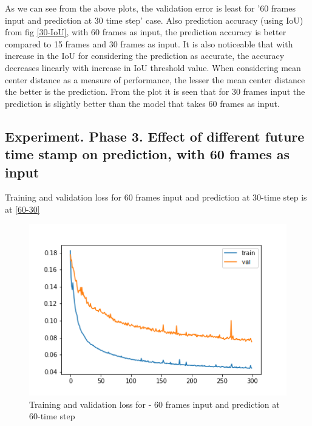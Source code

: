 



As we can see from the above plots, the validation error is least for '60 frames input and prediction at 30 time step' case. Also prediction accuracy (using IoU) from fig \ref{30-IoU}, with 60 frames as input, the prediction accuracy is better compared to 15 frames and 30 frames as input. It is also noticeable that with increase in the IoU for considering the prediction as accurate, the accuracy decreases linearly with increase in IoU threshold value. When considering mean center distance as a measure of performance, the lesser the mean center distance the better is the prediction. From the plot it is seen that for 30 frames input the prediction is slightly better than the model that takes 60 frames as input.

\subsection{Experiment. Phase 3. Effect of different future time stamp on prediction, with 60 frames as input}
Training and validation loss for 60 frames input and prediction at 30-time step is at \ref{60-30}

\begin{figure}[H] 
\includegraphics[scale=0.8]{conf12_300e_60_60ffuture}
\begin{center}
\caption{Training and validation loss for - 60 frames input and prediction at 60-time step }
\label{60-60}
\end{center}
\end{figure}

